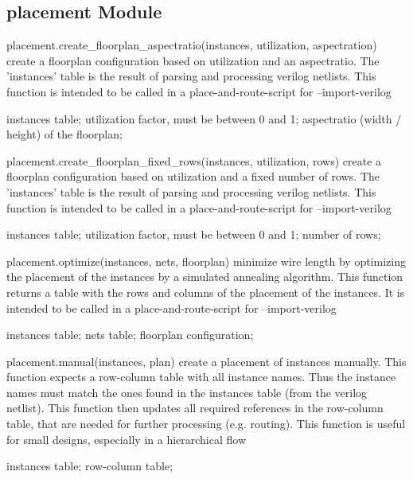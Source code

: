 \subsection{placement Module}
\begin{APIfunc}{placement.create\_floorplan\_aspectratio(instances, utilization, aspectration)}
    create a floorplan configuration based on utilization and an aspectratio. The 'instances' table is the result of parsing and processing verilog netlists. This function is intended to be called in a place-and-route-script for --import-verilog
    \begin{APIparameters}
            instances table;
            utilization factor, must be between 0 and 1;
            aspectratio (width / height) of the floorplan;
    \end{APIparameters}
\end{APIfunc}
\begin{APIfunc}{placement.create\_floorplan\_fixed\_rows(instances, utilization, rows)}
    create a floorplan configuration based on utilization and a fixed number of rows. The 'instances' table is the result of parsing and processing verilog netlists. This function is intended to be called in a place-and-route-script for --import-verilog
    \begin{APIparameters}
            instances table;
            utilization factor, must be between 0 and 1;
            number of rows;
    \end{APIparameters}
\end{APIfunc}
\begin{APIfunc}{placement.optimize(instances, nets, floorplan)}
    minimize wire length by optimizing the placement of the instances by a simulated annealing algorithm. This function returns a table with the rows and columns of the placement of the instances. It is intended to be called in a place-and-route-script for --import-verilog
    \begin{APIparameters}
            instances table;
            nets table;
            floorplan configuration;
    \end{APIparameters}
\end{APIfunc}
\begin{APIfunc}{placement.manual(instances, plan)}
    create a placement of instances manually. This function expects a row-column table with all instance names. Thus the instance names must match the ones found in the instances table (from the verilog netlist). This function then updates all required references in the row-column table, that are needed for further processing (e.g. routing). This function is useful for small designs, especially in a hierarchical flow
    \begin{APIparameters}
            instances table;
            row-column table;
    \end{APIparameters}
\end{APIfunc}
